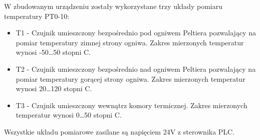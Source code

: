 \documentclass[oneside]{mgr}
\begin{document}
W zbudowanym urządzeniu zostały wykorzystane trzy układy pomiaru temperatury PT0-10:
\begin{itemize}
    \item T1 - Czujnik umieszczony bezpośrednio pod ogniwem Peltiera pozwalający na pomiar temperatury zimnej strony ogniwa. Zakres mierzonych temperatur wynosi -50\dots50 stopni C.
    \item T2 - Czujnik umieszczony bezpośrednio nad ogniwem Peltiera pozwalający na pomiar temperatury gorącej strony ogniwa. Zakres mierzonych temperatur wynosi 20\dots120 stopni C.
    \item T3 - Czujnik umieszczony wewnątrz komory termicznej. Zakres mierzonych temperatur wynosi 0\dots50 stopni C.
\end{itemize}
Wszystkie układu pomiarowe zasilane są napięciem 24V z sterownika PLC.
\newpage
\end{document}
